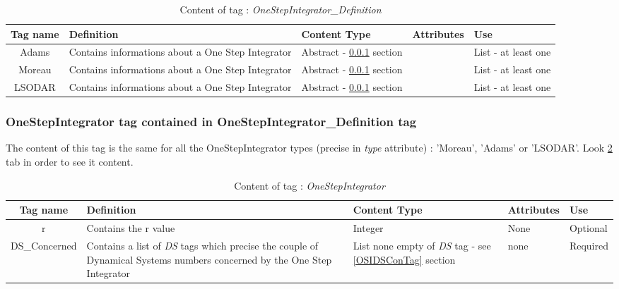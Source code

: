 \begin{table}[!hbp]
\begin{center}
\begin{tabular}{|c|p{4cm}|p{2cm}|p{3.5cm}|p{2cm}|}
\hline
\bf{Tag name} & \bf{Definition} & \bf{Content Type} & \bf{Attributes} & \bf{Use}
\\\hline
\hline
Adams	& Contains informations about a One Step Integrator & Abstract - \ref{OSITag} section & &  List - at least one \\
Moreau	& Contains informations about a One Step Integrator & Abstract - \ref{OSITag} section & &  List - at least one \\
LSODAR	& Contains informations about a One Step Integrator & Abstract - \ref{OSITag} section & &  List - at least one \\
\hline
\end{tabular}
\end{center}
\caption{Content of tag : \textit{OneStepIntegrator\_Definition}}
\label{tab-OSIDefinition}
\end{table}




\subsubsection{OneStepIntegrator tag contained in OneStepIntegrator\_Definition tag}
\label{OSITag}

The content of this tag is the same for all the OneStepIntegrator types (precise in \textit{type} attribute) : 'Moreau', 'Adams' or 'LSODAR'.
Look \ref{tab-OSI} tab in order to see it content.



\begin{table}[!hbp]
\begin{center}
\begin{tabular}{|c|p{6cm}|p{2cm}|p{3cm}|p{2cm}|}
\hline
\bf{Tag name} & \bf{Definition} & \bf{Content Type} & \bf{Attributes} & \bf{Use}
\\\hline
\hline
r		  & Contains the r value & Integer & None &  Optional \\
\hline
DS\_Concerned	  & Contains a list of \textit{DS} tags which precise the couple of Dynamical Systems numbers concerned by the One Step Integrator & List none empty of \textit{DS} tag - see \ref{OSIDSConTag} section & none &  Required \\
\hline
\end{tabular}
\end{center}
\caption{Content of tag : \textit{OneStepIntegrator}}
\label{tab-OSI}
\end{table}




